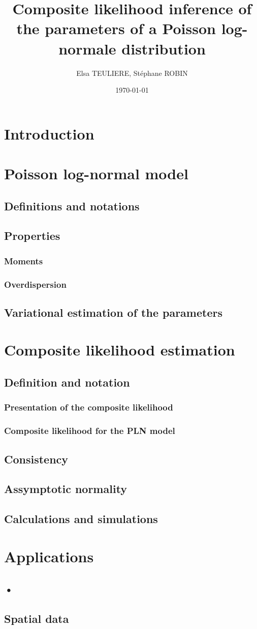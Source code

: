 \documentclass[11pt, a4paper]{article}
\title{	
Composite likelihood inference of the parameters of a Poisson log-normale distribution
}
\date{\today}
\author{Elsa TEULIERE, Stéphane ROBIN}
\begin{document}
\maketitle
\vspace{1cm}
\section*{Introduction}
\section{Poisson log-normal model}
\subsection{Definitions and notations}
\subsection{Properties}
\subsubsection{Moments}
\subsubsection{Overdispersion}
\subsection{Variational estimation of the parameters}
\section{Composite likelihood estimation}
\subsection{Definition and notation}
\subsubsection{Presentation of the composite likelihood}
\subsubsection{Composite likelihood for the PLN model}
\subsection{Consistency}

\subsection{Assymptotic normality}
\subsection{Calculations and simulations}
\section{Applications}
\subsection{•}
\subsection{Spatial data}
\end{document}
